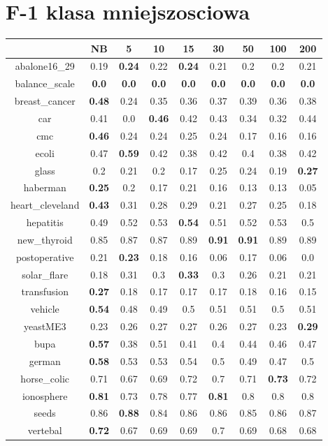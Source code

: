 \documentclass{article}%
\begin{document}
%
\section*{F{-}1 klasa mniejszosciowa}%
\begin{tabular}{c|cccccccc}%
\hline%
&NB&5&10&15&30&50&100&200\\%
\hline%
abalone16\_29&0.19&\textbf{0.24}&0.22&\textbf{0.24}&0.21&0.2&0.2&0.21\\%
\hline%
balance\_scale&\textbf{0.0}&\textbf{0.0}&\textbf{0.0}&\textbf{0.0}&\textbf{0.0}&\textbf{0.0}&\textbf{0.0}&\textbf{0.0}\\%
\hline%
breast\_cancer&\textbf{0.48}&0.24&0.35&0.36&0.37&0.39&0.36&0.38\\%
\hline%
car&0.41&0.0&\textbf{0.46}&0.42&0.43&0.34&0.32&0.44\\%
\hline%
cmc&\textbf{0.46}&0.24&0.24&0.25&0.24&0.17&0.16&0.16\\%
\hline%
ecoli&0.47&\textbf{0.59}&0.42&0.38&0.42&0.4&0.38&0.42\\%
\hline%
glass&0.2&0.21&0.2&0.17&0.25&0.24&0.19&\textbf{0.27}\\%
\hline%
haberman&\textbf{0.25}&0.2&0.17&0.21&0.16&0.13&0.13&0.05\\%
\hline%
heart\_cleveland&\textbf{0.43}&0.31&0.28&0.29&0.21&0.27&0.25&0.18\\%
\hline%
hepatitis&0.49&0.52&0.53&\textbf{0.54}&0.51&0.52&0.53&0.5\\%
\hline%
new\_thyroid&0.85&0.87&0.87&0.89&\textbf{0.91}&\textbf{0.91}&0.89&0.89\\%
\hline%
postoperative&0.21&\textbf{0.23}&0.18&0.16&0.06&0.17&0.06&0.0\\%
\hline%
solar\_flare&0.18&0.31&0.3&\textbf{0.33}&0.3&0.26&0.21&0.21\\%
\hline%
transfusion&\textbf{0.27}&0.18&0.17&0.17&0.17&0.18&0.16&0.15\\%
\hline%
vehicle&\textbf{0.54}&0.48&0.49&0.5&0.51&0.51&0.5&0.51\\%
\hline%
yeastME3&0.23&0.26&0.27&0.27&0.26&0.27&0.23&\textbf{0.29}\\%
\hline%
bupa&\textbf{0.57}&0.38&0.51&0.41&0.4&0.44&0.46&0.47\\%
\hline%
german&\textbf{0.58}&0.53&0.53&0.54&0.5&0.49&0.47&0.5\\%
\hline%
horse\_colic&0.71&0.67&0.69&0.72&0.7&0.71&\textbf{0.73}&0.72\\%
\hline%
ionosphere&\textbf{0.81}&0.73&0.78&0.77&\textbf{0.81}&0.8&0.8&0.8\\%
\hline%
seeds&0.86&\textbf{0.88}&0.84&0.86&0.86&0.85&0.86&0.87\\%
\hline%
vertebal&\textbf{0.72}&0.67&0.69&0.69&0.7&0.69&0.68&0.68\\%
\hline%
\end{tabular}
\end{document}
